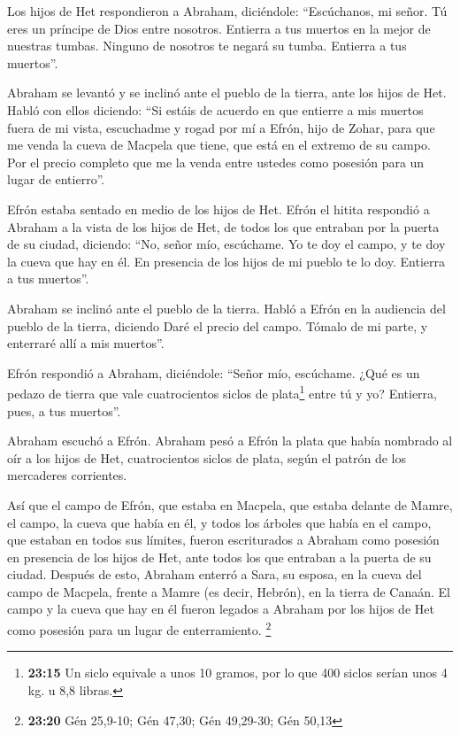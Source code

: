  Los hijos de Het respondieron a Abraham, diciéndole:
 ``Escúchanos, mi señor. Tú eres un príncipe de Dios entre
nosotros. Entierra a tus muertos en la mejor de nuestras tumbas. Ninguno
de nosotros te negará su tumba. Entierra a tus muertos''.

 Abraham se levantó y se inclinó ante el pueblo de la
tierra, ante los hijos de Het.  Habló con ellos diciendo:
``Si estáis de acuerdo en que entierre a mis muertos fuera de mi vista,
escuchadme y rogad por mí a Efrón, hijo de Zohar,  para
que me venda la cueva de Macpela que tiene, que está en el extremo de su
campo. Por el precio completo que me la venda entre ustedes como
posesión para un lugar de entierro''.

 Efrón estaba sentado en medio de los hijos de Het. Efrón
el hitita respondió a Abraham a la vista de los hijos de Het, de todos
los que entraban por la puerta de su ciudad, diciendo: 
``No, señor mío, escúchame. Yo te doy el campo, y te doy la cueva que
hay en él. En presencia de los hijos de mi pueblo te lo doy. Entierra a
tus muertos''.

 Abraham se inclinó ante el pueblo de la tierra.
 Habló a Efrón en la audiencia del pueblo de la tierra,
diciendo Daré el precio del campo. Tómalo de mi parte, y enterraré allí
a mis muertos''.

 Efrón respondió a Abraham, diciéndole: 
``Señor mío, escúchame. ¿Qué es un pedazo de tierra que vale
cuatrocientos siclos de plata\footnote{\textbf{23:15} Un siclo equivale
  a unos 10 gramos, por lo que 400 siclos serían unos 4 kg. u 8,8
  libras.} entre tú y yo? Entierra, pues, a tus muertos''.

 Abraham escuchó a Efrón. Abraham pesó a Efrón la plata
que había nombrado al oír a los hijos de Het, cuatrocientos siclos de
plata, según el patrón de los mercaderes corrientes.

 Así que el campo de Efrón, que estaba en Macpela, que
estaba delante de Mamre, el campo, la cueva que había en él, y todos los
árboles que había en el campo, que estaban en todos sus límites, fueron
escriturados  a Abraham como posesión en presencia de los
hijos de Het, ante todos los que entraban a la puerta de su ciudad.
 Después de esto, Abraham enterró a Sara, su esposa, en
la cueva del campo de Macpela, frente a Mamre (es decir, Hebrón), en la
tierra de Canaán.  El campo y la cueva que hay en él
fueron legados a Abraham por los hijos de Het como posesión para un
lugar de enterramiento. \footnote{\textbf{23:20} Gén 25,9-10; Gén 47,30;
  Gén 49,29-30; Gén 50,13}

